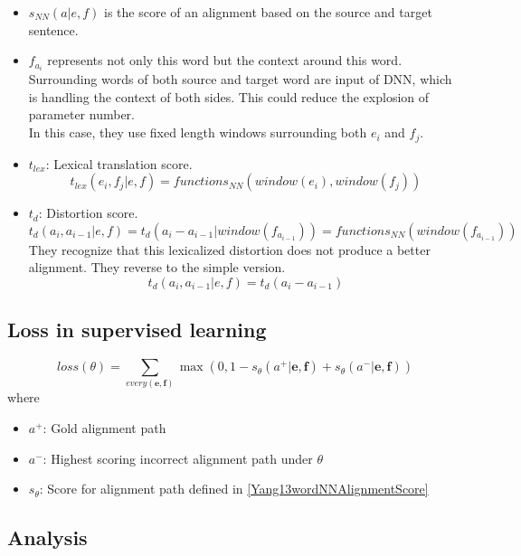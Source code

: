 \documentclass{article}
\begin{document}
	\begin{itemize}
	\item $s_{NN}(a|e, f)$ is the score of an alignment based on the source and target sentence.
	\item $f_{a_{i}}$ represents not only this word but the context around this word. Surrounding words of both source and target word are input of DNN, which is handling the context of both sides. This could reduce the explosion of parameter number. \\ In this case, they use fixed length windows surrounding both $e_{i}$ and $f_{j}$. 
	\item $t_{lex}$: Lexical translation score.
	\begin{equation}
	t_{lex}(e_{i},f_{j}|e,f) = functions_{NN}(window(e_{i}),window(f_{j}) )
	\label{Yang13wordLexicalTranslationScore}
	\end{equation}
	\item $t_{d}$: Distortion score.
	\begin{equation}
	t_{d}(a_{i}, a_{i-1}|e,f) = t_{d}(a_{i} - a_{i-1}|window(f_{a_{i-1}})) = functions_{NN}(window(f_{a_{i-1}}))
	\end{equation}
	They recognize that this lexicalized distortion does not produce a better alignment. They reverse to the simple version.
	\begin{equation}
	t_{d}(a_{i}, a_{i-1}|e,f) = t_{d}(a_{i} - a_{i-1})
	\end{equation}
	\end{itemize}

\subsection{Loss in supervised learning}
\begin{equation}
loss(\theta) = \sum_{every(\textbf{e},\textbf{f})} \max(0 , 1 - s_{\theta}(a^+ |\textbf{e},\textbf{f}) + s_{\theta}(a^- |\textbf{e},\textbf{f}) )
\label{Yang13wordAlignmentLoss}
\end{equation}
where
\begin{itemize}
\item $a^+$: Gold alignment path
\item $a^-$: Highest scoring incorrect alignment path under $\theta$
\item $s_\theta$: Score for alignment path defined in \eqref{Yang13wordNNAlignmentScore}
\end{itemize}

\subsection{Analysis}
\end{document}
